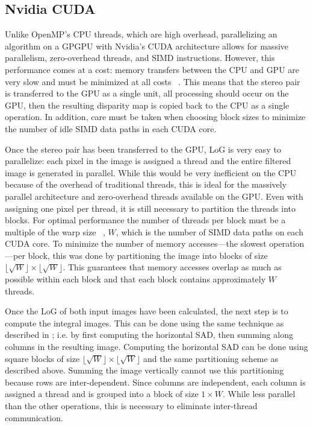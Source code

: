 \documentclass{article}
\newcommand{\floor}[1]{\lfloor#1\rfloor}
\begin{document}
\subsection{Nvidia CUDA}
\label{sec:parallel-cuda}
Unlike OpenMP's CPU threads, which are high overhead, parallelizing an
algorithm on a GPGPU with Nvidia's CUDA architecture allows for massive
parallelism, zero-overhead threads, and SIMD instructions.  However, this
performance comes at a cost: memory transfers between the CPU and GPU are very
slow and must be minimized at all costs ~\cite{cuda}. This means that the
stereo pair is transferred to the GPU as a single unit, all processing should
occur on the GPU, then the resulting disparity map is copied back to the CPU as
a single operation. In addition, care must be taken when choosing block sizes
to minimize the number of idle SIMD data paths in each CUDA core.

Once the stereo pair has been transferred to the GPU, LoG is very easy to
parallelize: each pixel in the image is assigned a thread and the entire
filtered image is generated in parallel. While this would be very inefficient
on the CPU because of the overhead of traditional threads, this is ideal for
the massively parallel architecture and zero-overhead threads available on the
GPU. Even with assigning one pixel per thread, it is still necessary to
partition the threads into blocks. For optimal performance the number of
threads per block must be a multiple of the warp size ~\cite{cuda}, $W$, which
is the number of SIMD data paths on each CUDA core. To minimize the number of
memory accesses---the slowest operation---per block, this was done by
partitioning the image into blocks of size $\floor{\sqrt{W}} \times
\floor{\sqrt{W}}$. This guarantees that memory accesses overlap as much as
possible within each block and that each block contains approximately $W$
threads.

Once the LoG of both input images have been calculated, the next step is to
compute the integral images. This can be done using the same technique as
described in ; i.e. by first computing the horizontal SAD, then
summing along columns in the resulting image. Computing the horizontal SAD can
be done using square blocks of size $\floor{\sqrt{W}} \times \floor{\sqrt{W}}$
and the same partitioning scheme as described above. Summing the image
vertically cannot use this partitioning because rows are inter-dependent. Since
columns are independent, each column is assigned a thread and is grouped into a
block of size $1 \times W$. While less parallel than the other operations, this
is necessary to eliminate inter-thread communication.
\end{document}
